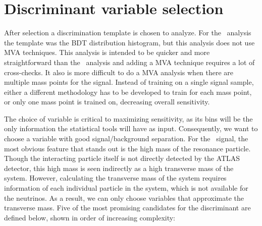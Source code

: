 

\section{Discriminant variable selection}
\label{SECTION-BPRIME-DISCRIMINANT}
After selection a discrimination template is chosen to analyze. For the \Wtchan\ analysis the template was the BDT distribution histogram, but this analysis does not use MVA techniques. This analysis is intended to be quicker and more straightforward than the \Wtchan\ analysis and adding a MVA technique requires a lot of cross-checks. It also is more difficult to do a MVA analysis when there are multiple mass points for the signal. Instead of training on a single signal sample, either a different methodology has to be developed to train for each mass point, or only one mass point is trained on, decreasing overall sensitivity.

The choice of variable is critical to maximizing sensitivity, as its bins will be the only information the statistical tools will have as input. Consequently, we want to choose a variable with good signal/background separation. For the \bstar\ signal, the most obvious feature that stands out is the high mass of the resonance particle. Though the interacting particle itself is not directly detected by the ATLAS detector, this high mass is seen indirectly as a high transverse mass of the system. However, calculating the transverse mass of the system requires information of each individual particle in the system, which is not available for the neutrinos. As a result, we can only choose variables that approximate the transverse mass. Five of the most promising candidates for the discriminant are defined below, shown in order of increasing complexity:

